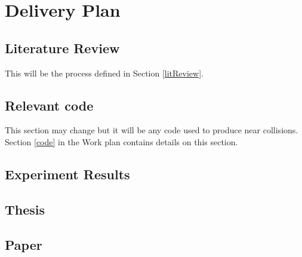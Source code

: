 \chapter{Delivery Plan}


\section{Literature Review}
This will be the process defined in Section \ref{litReview}.

\section{Relevant code}
This section may change but it will be any code used to produce near collisions. Section \ref{code} in the Work plan contains details on this section.

\section{Experiment Results}

\section{Thesis}

\section{Paper}